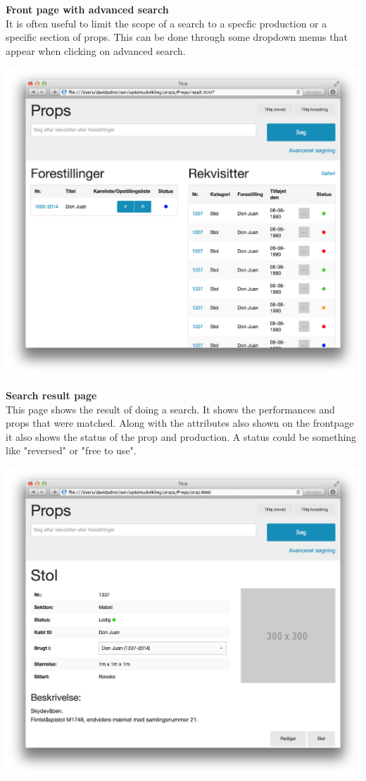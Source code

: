 \documentclass[12pt]{article}
\begin{document}
\newline
\textbf{Front page with advanced search}\\
It is often useful to limit the scope of a search to a specfic production or a specific section of props. This can be done through some dropdown menus that appear when clicking on advanced search.
\newline
\newline
\centerline{\includegraphics[scale=0.25]{prototype_search_result.png}}
\newline
\textbf{Search result page}\\
This page shows the result of doing a search. It shows the performances and props that were matched. Along with the attributes also shown on the frontpage it also shows the status of the prop and production. A status could be something like "reversed" or "free to use".
\newline
\newline
\centerline{\includegraphics[scale=0.25]{prototype_show_prop.png}}
\end{document}
